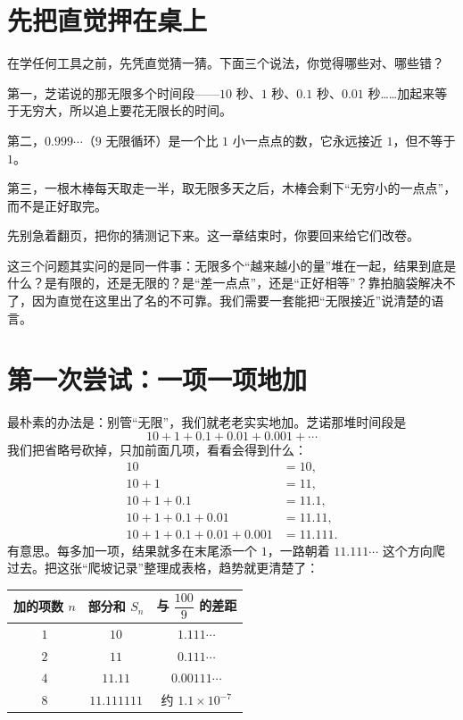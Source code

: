 \section{先把直觉押在桌上}

在学任何工具之前，先凭直觉猜一猜。下面三个说法，你觉得哪些对、哪些错？

第一，芝诺说的那无限多个时间段——$10$ 秒、$1$ 秒、$0.1$ 秒、$0.01$ 秒……加起来等于无穷大，所以追上要花无限长的时间。

第二，$0.999\cdots$（$9$ 无限循环）是一个比 $1$ 小一点点的数，它永远接近 $1$，但不等于 $1$。

第三，一根木棒每天取走一半，取无限多天之后，木棒会剩下“无穷小的一点点”，而不是正好取完。

先别急着翻页，把你的猜测记下来。这一章结束时，你要回来给它们改卷。

这三个问题其实问的是同一件事：无限多个“越来越小的量”堆在一起，结果到底是什么？是有限的，还是无限的？是“差一点点”，还是“正好相等”？靠拍脑袋解决不了，因为直觉在这里出了名的不可靠。我们需要一套能把“无限接近”说清楚的语言。

\section{第一次尝试：一项一项地加}

最朴素的办法是：别管“无限”，我们就老老实实地加。芝诺那堆时间段是
\[
10+1+0.1+0.01+0.001+\cdots
\]
我们把省略号砍掉，只加前面几项，看看会得到什么：
\[
\begin{aligned}
10 &= 10,\\
10+1 &= 11,\\
10+1+0.1 &= 11.1,\\
10+1+0.1+0.01 &= 11.11,\\
10+1+0.1+0.01+0.001 &= 11.111.
\end{aligned}
\]
有意思。每多加一项，结果就多在末尾添一个 $1$，一路朝着 $11.111\cdots$ 这个方向爬过去。把这张“爬坡记录”整理成表格，趋势就更清楚了：

\begin{center}
\begin{tabular}{ccc}
\toprule
加的项数 $n$ & 部分和 $S_n$ & 与 $\dfrac{100}{9}$ 的差距 \\
\midrule
$1$ & $10$ & $1.111\cdots$ \\
$2$ & $11$ & $0.111\cdots$ \\
$4$ & $11.11$ & $0.00111\cdots$ \\
$8$ & $11.111111$ & 约 $1.1\times 10^{-7}$ \\
\bottomrule
\end{tabular}
\end{center}

